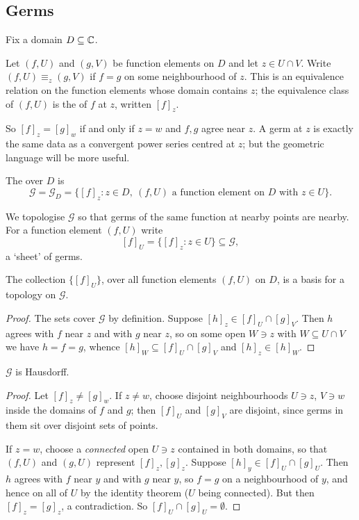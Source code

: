 \documentclass[a4paper]{scrartcl}
\begin{document}
\subsection{Germs}

Fix a domain $D \subseteq \mathbb{C}$.

\begin{definition}[Germ]
	Let $(f, U)$ and $(g, V)$ be function elements on $D$ and let $z \in U \cap V$. Write
	$(f,U) \equiv_z (g,V)$ if $f = g$ on some neighbourhood of $z$. This is an equivalence
	relation on the function elements whose domain contains $z$; the equivalence class of
	$(f,U)$ is the  of $f$ at $z$, written $[f]_z$.
\end{definition}

So $[f]_z = [g]_w$ if and only if $z = w$ and $f, g$ agree near $z$. A germ at $z$ is
exactly the same data as a convergent power series centred at $z$; but the geometric
language will be more useful.

\begin{definition}
	The  over $D$ is
	$$
	\mathcal{G} = \mathcal{G}_D = \{[f]_z : z \in D, \ (f,U) \text{ a function element on } D \text{ with } z \in U\}.
	$$
\end{definition}

We topologise $\mathcal{G}$ so that germs of the same function at nearby points are
nearby. For a function element $(f,U)$ write
$$
[f]_U = \{[f]_z : z \in U\} \subseteq \mathcal{G},
$$
a `sheet' of germs.

\begin{lemma}
	The collection $\{[f]_U\}$, over all function elements $(f,U)$ on $D$, is a basis for a
	topology on $\mathcal{G}$.
\end{lemma}

\begin{proof}
	The sets cover $\mathcal{G}$ by definition. Suppose $[h]_z \in [f]_U \cap [g]_V$. Then
	$h$ agrees with $f$ near $z$ and with $g$ near $z$, so on some open $W \ni z$ with
	$W \subseteq U \cap V$ we have $h = f = g$, whence
	$[h]_W \subseteq [f]_U \cap [g]_V$ and $[h]_z \in [h]_W$.
\end{proof}

\begin{lemma}\label{lem:germshausdorff}
	$\mathcal{G}$ is Hausdorff.
\end{lemma}

\begin{proof}
	Let $[f]_z \neq [g]_w$. If $z \neq w$, choose disjoint neighbourhoods $U \ni z$,
	$V \ni w$ inside the domains of $f$ and $g$; then $[f]_U$ and $[g]_V$ are disjoint,
	since germs in them sit over disjoint sets of points.

	If $z = w$, choose a \emph{connected} open $U \ni z$ contained in both domains, so that
	$(f, U)$ and $(g,U)$ represent $[f]_z, [g]_z$. Suppose $[h]_y \in [f]_U \cap [g]_U$.
	Then $h$ agrees with $f$ near $y$ and with $g$ near $y$, so $f = g$ on a neighbourhood
	of $y$, and hence on all of $U$ by the identity theorem ($U$ being connected). But then
	$[f]_z = [g]_z$, a contradiction. So $[f]_U \cap [g]_U = \emptyset$.
\end{proof}
\end{document}
